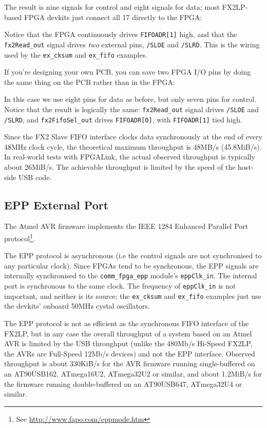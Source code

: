 The result is nine signals for control and eight signals for data; most FX2LP-based FPGA devkits just connect all 17 directly to the FPGA:


Notice that the FPGA continuously drives \texttt{FIFOADR[1]} high, and that the \texttt{fx2Read\_out} signal drives \textit{two} external pins, \texttt{/SLOE} and \texttt{/SLRD}. This is the wiring used by the \texttt{ex\_cksum} and \texttt{ex\_fifo} examples.

\newpage
If you're designing your own PCB, you can save two FPGA I/O pins by doing the same thing on the PCB rather than in the FPGA:


In this case we use eight pins for data as before, but only seven pins for control. Notice that the result is logically the same: \texttt{fx2Read\_out} signal drives \texttt{/SLOE} and \texttt{/SLRD}, and \texttt{fx2FifoSel\_out} drives \texttt{FIFOADR[0]}, with \texttt{FIFOADR[1]} tied high.

Since the FX2 Slave FIFO interface clocks data synchronously at the end of every 48MHz clock cycle, the theoretical maximum throughput is 48MB/s (45.8MiB/s). In real-world tests with FPGALink, the actual observed throughput is typically about 26MiB/s. The achievable throughput is limited by the speed of the host-side USB code.

\subsection{EPP External Port}
The Atmel AVR firmware implements the IEEE 1284 Enhanced Parallel Port protocol\footnote{See \url{http://www.fapo.com/eppmode.htm}}.


The EPP protocol is asynchronous (i.e the control signals are not synchronised to any particular clock). Since FPGAs tend to be synchronous, the EPP signals are internally synchronised to the \texttt{comm\_fpga\_epp} module's \texttt{eppClk\_in}. The internal port is synchronous to the same clock. The frequency of \texttt{eppClk\_in} is not important, and neither is its source; the \texttt{ex\_cksum} and \texttt{ex\_fifo} examples just use the devkits' onboard 50MHz cystal oscillators.

The EPP protocol is not as efficient as the synchronous FIFO interface of the FX2LP, but in any case the overall throughput of a system based on an Atmel AVR is limited by the USB throughput (unlike the 480Mb/s Hi-Speed FX2LP, the AVRs are Full-Speed 12Mb/s devices) and not the EPP interface. Observed throughput is about 330KiB/s for the AVR firmware running single-buffered on an AT90USB162, ATmega16U2, ATmega32U2 or similar, and about 1.2MiB/s for the firmware running double-buffered on an AT90USB647, ATmega32U4 or similar.


